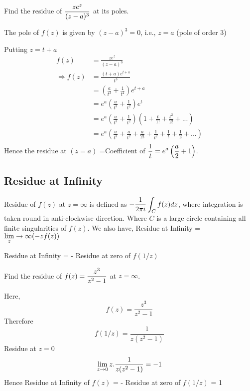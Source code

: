 \begin{example}
Find the residue of $\displaystyle \frac{ze^z}{(z-a)^3}$ at its poles.
\end{example}
\begin{solution}
The pole of $f(z)$ is given by $(z-a)^3 = 0$, i.e., $z=a$ (pole of order 3)

\noindent
Putting $z = t+a$
\begin{align*}
f(z) &= \frac{ze^z}{(z-a)^3} \\
\Rightarrow f(z) &=\frac{(t+a)e^{t+a}}{t^3} \\
&=\left(\frac{a}{t^3} + \frac{1}{t^2}\right)e^{t+a} \\
&=e^a \left(\frac{a}{t^3} + \frac{1}{t^2}\right)e^{t} \\
&=e^a \left(\frac{a}{t^3} + \frac{1}{t^2}\right)\left(1+\frac{t}{1!} + \frac{t^2}{2!} + ...\right) \\
&=e^a \left(\frac{a}{t^3} + \frac{a}{t^2} + \frac{a}{2t} + \frac{1}{t^2} + \frac{1}{t} + \frac{1}{2} + ... \right) \\
\end{align*}
Hence the residue at $(z=a)$ =Coefficient of $\displaystyle \frac{1}{t} = e^a\left(\frac{a}{2}+1\right)$.
\end{solution}
\subsection{Residue at Infinity}
Residue of $f(z)$ at $z=\infty$ is defined as $\displaystyle -\frac{1}{2\pi i}\int_C f(z) dz$, where integration is taken round in anti-clockwise direction. Where $C$ is a large circle containing all finite singularities of $f(z)$.
We also have,
Residue at Infinity = $\displaystyle \lim_z\rightarrow \infty (-zf(z))$

Residue at Infinity = - Residue at zero of $f(1/z)$

\begin{example}
Find the residue of $\displaystyle f(z)=\frac{z^3}{z^2-1}$ at $z=\infty$.
\end{example}
\begin{solution}

Here, 
\[f(z) = \frac{z^3}{z^2-1} \]
Therefore
\[f(1/z) = \frac{1}{z(z^2-1)} \]
Residue at $z=0$
\[\lim_{z\rightarrow 0} z.\frac{1}{z(z^2-1)} = -1\]
Hence
Residue at Infinity of $f(z)$ = - Residue at zero of $f(1/z)$ = 1
\end{solution}


